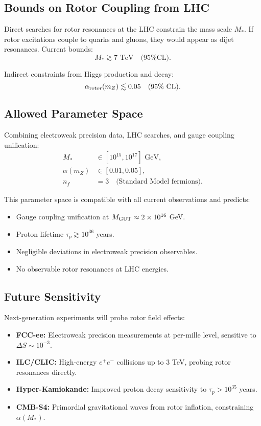 \documentclass[11pt,a4paper]{article}
\numberwithin{equation}{section}
\theoremstyle{plain}
\theoremstyle{definition}
\theoremstyle{remark}
\begin{document}
\subsection{Bounds on Rotor Coupling from LHC}

Direct searches for rotor resonances at the LHC constrain the mass scale $M_*$. If rotor excitations couple to quarks and gluons, they would appear as dijet resonances. Current bounds:
\begin{equation}
M_* \gtrsim 7\text{ TeV} \quad\text{(95\% CL)}.
\label{eq:M-star-LHC}
\end{equation}

Indirect constraints from Higgs production and decay:
\begin{equation}
\alpha_{\rm rotor}(m_Z) \lesssim 0.05 \quad\text{(95\% CL)}.
\label{eq:alpha-LHC}
\end{equation}

\subsection{Allowed Parameter Space}

Combining electroweak precision data, LHC searches, and gauge coupling unification:
\begin{align}
M_* &\in [10^{15}, 10^{17}]\text{ GeV}, \label{eq:M-star-allowed}\\
\alpha(m_Z) &\in [0.01, 0.05], \label{eq:alpha-allowed}\\
n_f &= 3 \quad\text{(Standard Model fermions)}.
\label{eq:nf-allowed}
\end{align}

This parameter space is compatible with all current observations and predicts:
\begin{itemize}
  \item Gauge coupling unification at $M_{\rm GUT}\approx 2\times 10^{16}$ GeV.
  \item Proton lifetime $\tau_p \gtrsim 10^{36}$ years.
  \item Negligible deviations in electroweak precision observables.
  \item No observable rotor resonances at LHC energies.
\end{itemize}

\subsection{Future Sensitivity}

Next-generation experiments will probe rotor field effects:
\begin{itemize}
  \item \textbf{FCC-ee:} Electroweak precision measurements at per-mille level, sensitive to $\Delta S\sim 10^{-3}$.
  \item \textbf{ILC/CLIC:} High-energy $e^+e^-$ collisions up to 3 TeV, probing rotor resonances directly.
  \item \textbf{Hyper-Kamiokande:} Improved proton decay sensitivity to $\tau_p > 10^{35}$ years.
  \item \textbf{CMB-S4:} Primordial gravitational waves from rotor inflation, constraining $\alpha(M_*)$.
\end{itemize}
\end{document}
